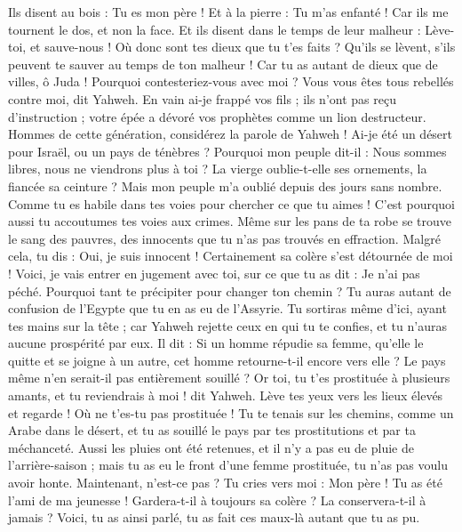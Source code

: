 \begin{multicols}{2}
Ils disent au bois : Tu es mon père ! Et à la pierre : Tu m'as enfanté ! Car ils me tournent le dos, et non la face. Et ils disent dans le temps de leur malheur : Lève-toi, et sauve-nous !
Où donc sont tes dieux que tu t'es faits ? Qu'ils se lèvent, s'ils peuvent te sauver au temps de ton malheur ! Car tu as autant de dieux que de villes, ô Juda !
Pourquoi contesteriez-vous avec moi ? Vous vous êtes tous rebellés contre moi, dit Yahweh.
En vain ai-je frappé vos fils ; ils n'ont pas reçu d'instruction ; votre épée a dévoré vos prophètes comme un lion destructeur.
Hommes de cette génération, considérez la parole de Yahweh ! Ai-je été un désert pour Israël, ou un pays de ténèbres ? Pourquoi mon peuple dit-il : Nous sommes libres, nous ne viendrons plus à toi ?
La vierge oublie-t-elle ses ornements, la fiancée sa ceinture ? Mais mon peuple m'a oublié depuis des jours sans nombre.
Comme tu es habile dans tes voies pour chercher ce que tu aimes ! C'est pourquoi aussi tu accoutumes tes voies aux crimes.
Même sur les pans de ta robe se trouve le sang des pauvres, des innocents que tu n'as pas trouvés en effraction.
Malgré cela, tu dis : Oui, je suis innocent ! Certainement sa colère s'est détournée de moi ! Voici, je vais entrer en jugement avec toi, sur ce que tu as dit : Je n'ai pas péché.
Pourquoi tant te précipiter pour changer ton chemin ? Tu auras autant de confusion de l'Egypte que tu en as eu de l'Assyrie.
Tu sortiras même d'ici, ayant tes mains sur la tête ; car Yahweh rejette ceux en qui tu te confies, et tu n'auras aucune prospérité par eux.
\VerseOne{}Il dit : Si un homme répudie sa femme, qu'elle le quitte et se joigne à un autre, cet homme retourne-t-il encore vers elle ? Le pays même n'en serait-il pas entièrement souillé ? Or toi, tu t'es prostituée à plusieurs amants, et tu reviendrais à moi ! dit Yahweh.
Lève tes yeux vers les lieux élevés et regarde ! Où ne t'es-tu pas prostituée ! Tu te tenais sur les chemins, comme un Arabe dans le désert, et tu as souillé le pays par tes prostitutions et par ta méchanceté.
Aussi les pluies ont été retenues, et il n'y a pas eu de pluie de l'arrière-saison ; mais tu as eu le front d'une femme prostituée, tu n'as pas voulu avoir honte.
Maintenant, n'est-ce pas ? Tu cries vers moi : Mon père ! Tu as été l'ami de ma jeunesse !
Gardera-t-il à toujours sa colère ? La conservera-t-il à jamais ? Voici, tu as ainsi parlé, tu as fait ces maux-là autant que tu as pu.

\end{multicols}
